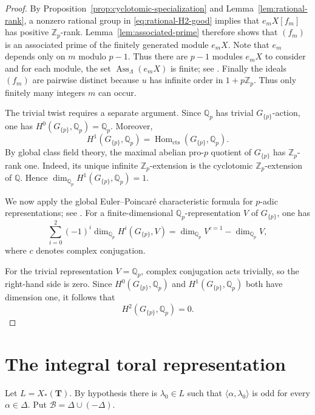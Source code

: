 \documentclass[11pt]{amsart}
\numberwithin{equation}{section}
\newcommand{\Q}{\mathbb Q}
\newcommand{\Qp}{\mathbb Q_p}
\newcommand{\Zp}{\mathbb Z_p}
\newcommand{\Hom}{\operatorname{Hom}}
\newcommand{\Ass}{\operatorname{Ass}}
\newcommand{\TT}{\mathbf T}
\theoremstyle{definition}
\begin{document}
\begin{proof}
By Proposition~\ref{prop:cyclotomic-specialization} and Lemma~\ref{lem:rational-rank}, a nonzero rational group in \eqref{eq:rational-H2-good} implies that $e_mX[f_m]$ has positive $\Zp$-rank.  Lemma~\ref{lem:associated-prime} therefore shows that $(f_m)$ is an associated prime of the finitely generated module $e_mX$.  Note that $e_m$ depends only on $m$ modulo $p-1$. Thus there are $p-1$ modules $e_m X$ to consider and for each module, the set $\Ass_\Lambda(e_mX)$ is finite; see \cite[Theorem~6.5(i)]{MatsumuraCRT}. Finally the ideals $(f_m)$ are pairwise distinct because $u$ has infinite order in $1+p\Zp$.  Thus only finitely many integers $m$ can occur.

The trivial twist requires a separate argument. Since $\Qp$ has trivial
$G_{\{p\}}$-action, one has $H^0(G_{\{p\}},\Qp)=\Qp$. Moreover,
\[
        H^1(G_{\{p\}},\Qp)
        =
        \Hom_{\mathrm{cts}}(G_{\{p\}},\Qp).
\]
By global class field theory, the maximal abelian pro-$p$ quotient of
$G_{\{p\}}$ has $\Zp$-rank one. Indeed, its unique infinite
$\Zp$-extension is the cyclotomic $\Zp$-extension of $\Q$. Hence
$\dim_{\Qp}H^1(G_{\{p\}},\Qp)=1$.

We now apply the global Euler--Poincar\'e characteristic formula for
$p$-adic representations; see \cite[Lemma~9.7]{Kisin2003}. For a
finite-dimensional $\Qp$-representation $V$ of $G_{\{p\}}$, one has
\[
 \sum_{i=0}^{2}(-1)^i
 \dim_{\Qp}H^i(G_{\{p\}},V)
 =
 \dim_{\Qp}V^{c=1}-\dim_{\Qp}V,
\]
where $c$ denotes complex conjugation.

For the trivial representation $V=\Qp$, complex conjugation acts
trivially, so the right-hand side is zero. Since
$H^0(G_{\{p\}},\Qp)$ and $H^1(G_{\{p\}},\Qp)$ both have dimension
one, it follows that
\[
        H^2(G_{\{p\}},\Qp)=0.
\]
\end{proof}



\section{The integral toral representation}\label{sec:toral}

Let $L=X_*(\TT)$.  By hypothesis there is
$\lambda_0\in L$ such that
$\langle\alpha,\lambda_0\rangle$ is odd for every
$\alpha\in\Delta$. Put $\mathcal B=\Delta\cup(-\Delta)$.
\end{document}

